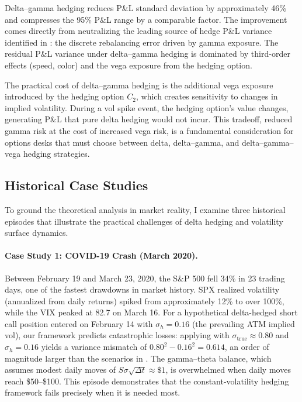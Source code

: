 \documentclass[11pt,a4paper]{article}
\begin{document}
Delta--gamma hedging reduces P\&L standard deviation by approximately 46\% and compresses the 95\% P\&L range by a comparable factor. The improvement comes directly from neutralizing the leading source of hedge P\&L variance identified in : the discrete rebalancing error driven by gamma exposure. The residual P\&L variance under delta--gamma hedging is dominated by third-order effects (speed, color) and the vega exposure from the hedging option.

The practical cost of delta--gamma hedging is the additional vega exposure introduced by the hedging option $C_2$, which creates sensitivity to changes in implied volatility. During a vol spike event, the hedging option's value changes, generating P\&L that pure delta hedging would not incur. This tradeoff, reduced gamma risk at the cost of increased vega risk, is a fundamental consideration for options desks that must choose between delta, delta--gamma, and delta--gamma--vega hedging strategies.


\subsection{Historical Case Studies}\label{subsec:case_studies}

To ground the theoretical analysis in market reality, I examine three historical episodes that illustrate the practical challenges of delta hedging and volatility surface dynamics.

\paragraph{Case Study 1: COVID-19 Crash (March 2020).}
Between February 19 and March 23, 2020, the S\&P 500 fell 34\% in 23 trading days, one of the fastest drawdowns in market history. SPX realized volatility (annualized from daily returns) spiked from approximately 12\% to over 100\%, while the VIX peaked at 82.7 on March 16. For a hypothetical delta-hedged short call position entered on February 14 with $\sigma_h = 0.16$ (the prevailing ATM implied vol), our framework predicts catastrophic losses: applying  with $\sigma_{\text{true}} \approx 0.80$ and $\sigma_h = 0.16$ yields a variance mismatch of $0.80^2 - 0.16^2 = 0.614$, an order of magnitude larger than the scenarios in . The gamma--theta balance, which assumes modest daily moves of $S\sigma\sqrt{\Delta t} \approx \$1$, is overwhelmed when daily moves reach \$50--\$100. This episode demonstrates that the constant-volatility hedging framework fails precisely when it is needed most.
\end{document}
